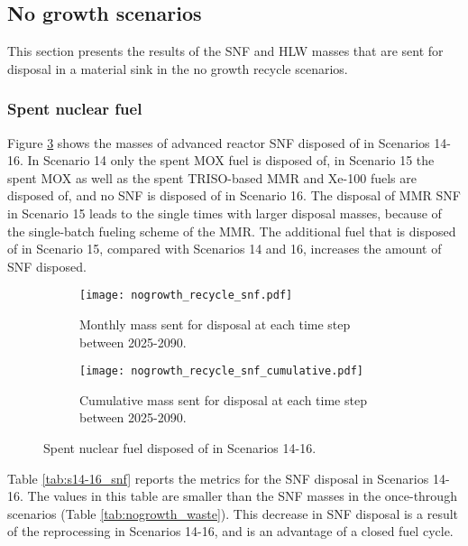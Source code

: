 \subsection{No growth scenarios}
This section presents the results of the \gls{SNF} and 
\gls{HLW} masses that are sent for disposal in a 
material sink in the no growth recycle scenarios. 

\subsubsection{Spent nuclear fuel}
Figure \ref{fig:nogrowth_recycle_snf} shows the 
masses of advanced reactor \gls{SNF} disposed of 
in Scenarios 14-16. In Scenario 14 only the spent \gls{MOX} 
fuel is disposed of, in Scenario 15 the spent \gls{MOX} as 
well as the spent \gls{TRISO}-based \gls{MMR} and Xe-100 fuels 
are disposed of, 
and no \gls{SNF} is disposed of in Scenario 16. The disposal of 
\gls{MMR} \gls{SNF} in Scenario 15 leads to the single times 
with larger disposal masses, because of the single-batch 
fueling scheme of the \gls{MMR}. The additional fuel that 
is disposed of in Scenario 15, compared with Scenarios 
14 and 16, increases the amount of \gls{SNF} disposed. 

\begin{figure}[h!]
    \centering
    \begin{subfigure}[b]{0.49\textwidth}
        \centering
        \texttt{[image: nogrowth\_recycle\_snf.pdf]}
        \caption{Monthly mass sent for disposal 
        at each time step between 2025-2090.}
        \label{fig:nogrowth_recycle_snf_all}
    \end{subfigure}
    \hfill
    \begin{subfigure}[b]{0.49\textwidth}
        \centering
        \texttt{[image: nogrowth\_recycle\_snf\_cumulative.pdf]}
        \caption{Cumulative mass sent for disposal 
        at each time step between 2025-2090.}
        \label{fig:nogrowth_recycle_snf_cumulative}
    \end{subfigure}
       \caption{Spent nuclear fuel disposed of in Scenarios 14-16.}
       \label{fig:nogrowth_recycle_snf}
\end{figure}

Table \ref{tab:s14-16_snf} reports the metrics for the \gls{SNF} disposal 
in Scenarios 14-16. The values in this table are smaller than 
the \gls{SNF} masses in the once-through scenarios (Table 
\ref{tab:nogrowth_waste}). This decrease in \gls{SNF} disposal is 
a result of the reprocessing in Scenarios 14-16, and is an 
advantage of a closed fuel cycle. 

